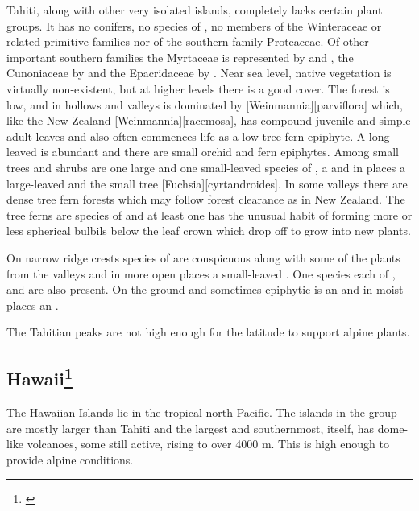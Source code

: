 Tahiti, along with other very isolated islands, completely lacks certain plant groups.
It has no conifers, no species of , no members of the Winteraceae or related primitive families nor of the southern family Proteaceae.
Of other important southern families the Myrtaceae is represented by  and , the Cunoniaceae by  and the Epacridaceae by .
Near sea level, native vegetation is virtually non-existent, but at higher levels there is a good cover.
The forest is low, and in hollows and valleys is dominated by [Weinmannia][parviflora] which, like the New Zealand [Weinmannia][racemosa], has compound juvenile and simple adult leaves and also often commences life as a low tree fern epiphyte.
A long leaved  is abundant and there are small orchid and fern epiphytes.
Among small trees and shrubs are one large and one small-leaved species of , a  and in places a large-leaved  and the small tree [Fuchsia][cyrtandroides].
In some valleys there are dense tree fern forests which may follow forest clearance as in New Zealand.
The tree ferns are species of  and at least one has the unusual habit of forming more or less spherical bulbils below the leaf crown which drop off to grow into new plants.

On narrow ridge crests species of  are conspicuous along with some of the plants from the valleys and in more open places a small-leaved .
One species each of ,  and  are also present.
On the ground and sometimes epiphytic is an  and in moist places an .

The Tahitian peaks are not high enough for the latitude to support alpine plants.

\subsection[Hawai{\okina}i]{Hawai{\okina}i\thinspace\footnote{\cite{carlquist1970hawaii}}}

The Hawaiian Islands lie in the tropical north Pacific.
The islands in the group are mostly larger than Tahiti and the largest and southernmost,  itself, has dome-like volcanoes, some still active, rising to over 4000 m.
This is high enough to provide alpine conditions.

